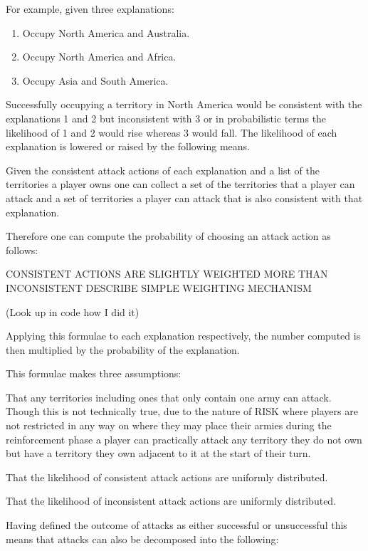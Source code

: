 \documentclass[parskip]{cs4rep}
\begin{document}
For example, given three explanations:

\begin{enumerate}
\item
Occupy North America and Australia.
\item
Occupy North America and Africa.
\item
Occupy Asia and South America.
\end{enumerate}

Successfully occupying a territory in North America would be consistent with the explanations 1 and 2 but inconsistent with 3 or in probabilistic terms the likelihood of 1 and 2 would rise whereas 3 would fall. The likelihood of each explanation is lowered or raised by the following means. 

Given the consistent attack actions of each explanation and a list of the territories a player owns one can collect a set of the territories that a player can attack and a set of territories a player can attack that is also consistent with that explanation.

Therefore one can compute the probability of choosing an attack action as follows:

CONSISTENT ACTIONS ARE SLIGHTLY WEIGHTED MORE THAN INCONSISTENT DESCRIBE SIMPLE WEIGHTING MECHANISM

(Look up in code how I did it)

Applying this formulae to each explanation respectively, the number computed is then multiplied by the probability of the explanation.

This formulae makes three assumptions:

That any territories including ones that only contain one army can attack. Though this is not technically true, due to the nature of RISK where players are not restricted in any way on where they may place their armies during the reinforcement phase a player can practically attack any territory they do not own but have a territory they own adjacent to it at the start of their turn.

That the likelihood of consistent attack actions are uniformly distributed.

That the likelihood of inconsistent attack actions are uniformly distributed.

Having defined the outcome of attacks as either successful or unsuccessful this means that attacks can also be decomposed into the following: 
\end{document}
